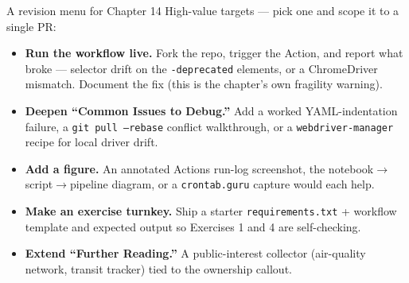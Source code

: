 \documentclass[9pt,aspectratio=169]{beamer}
\begin{document}
\begin{frame}{A revision menu for Chapter 14}
    High-value targets --- pick one and scope it to a single PR:
    \begin{itemize}
        \item \textbf{Run the workflow live.} Fork the repo, trigger the Action, and report what broke --- selector drift on the \texttt{-deprecated} elements, or a ChromeDriver mismatch. Document the fix (this is the chapter's own fragility warning).
        \item \textbf{Deepen ``Common Issues to Debug.''} Add a worked YAML-indentation failure, a \texttt{git pull --rebase} conflict walkthrough, or a \texttt{webdriver-manager} recipe for local driver drift.
        \item \textbf{Add a figure.} An annotated Actions run-log screenshot, the notebook$\rightarrow$script$\rightarrow$pipeline diagram, or a \texttt{crontab.guru} capture would each help.
        \item \textbf{Make an exercise turnkey.} Ship a starter \texttt{requirements.txt} + workflow template and expected output so Exercises 1 and 4 are self-checking.
        \item \textbf{Extend ``Further Reading.''} A public-interest collector (air-quality network, transit tracker) tied to the ownership callout.
    \end{itemize}
\end{frame}
\end{document}
